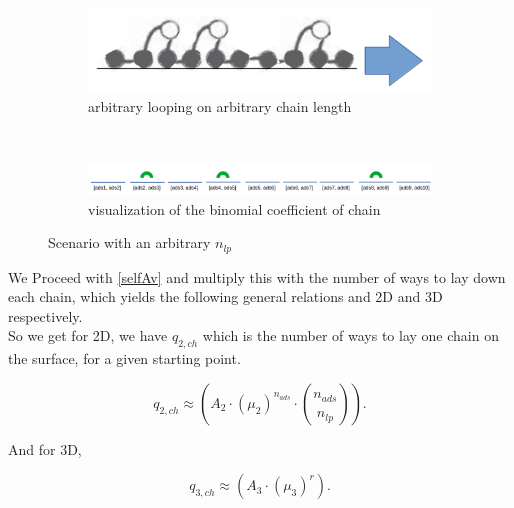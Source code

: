\documentclass[10pt,letterpaper]{article}
\begin{document}
\begin{figure}[h!]
	\centering
	\begin{subfigure}[b]{0.2\textwidth}
		\centering
		\includegraphics[scale=0.2]{multiloops.png}
		\caption{arbitrary looping on arbitrary chain length}
		\label{loop and train}
	\end{subfigure}~~
	\begin{subfigure}[b]{0.6\textwidth}
		\centering
		\includegraphics[scale=0.3]{LoopingGraphic.png}
		\caption{visualization of the binomial coefficient of chain}
		\label{loop and train}		
	\end{subfigure}
\caption{Scenario with an arbitrary $n_{lp}$}
\end{figure}



\noindent We Proceed with \ref{selfAv} and multiply this with the number of ways to lay down each chain, which yields the following general relations and 2D and 3D respectively.\\ 


\noindent So we get for 2D, we have $q_{2,ch}$ which is
the number of ways to lay one chain on the surface, for a given starting point.

\begin{equation}
    \boxed{
    	q_{2,ch}\approx \left(A_2\cdot (\mu_{2})^{n_{ads}} \cdot \binom{n_{ads}}{n_{lp}} \right). 
    }
	\label{eq. q2}
\end{equation}

\noindent And for 3D, 

\begin{equation}
    \boxed{
	    q_{3,ch}\approx \left(A_3\cdot (\mu_{3})^{r}\right).
	}
	\label{eq. q3}
\end{equation}



%
\end{document}
